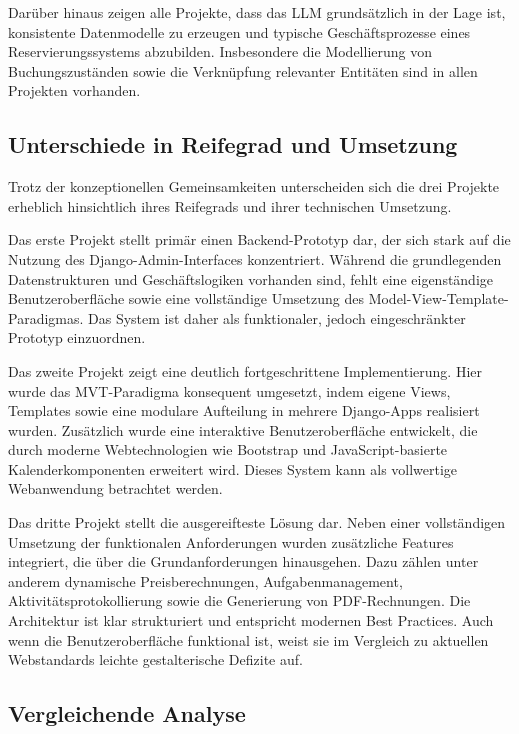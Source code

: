 Darüber hinaus zeigen alle Projekte, dass das LLM grundsätzlich in der Lage ist, konsistente Datenmodelle zu erzeugen und typische Geschäftsprozesse eines Reservierungssystems abzubilden. Insbesondere die Modellierung von Buchungszuständen sowie die Verknüpfung relevanter Entitäten sind in allen Projekten vorhanden.

\subsection{Unterschiede in Reifegrad und Umsetzung}

Trotz der konzeptionellen Gemeinsamkeiten unterscheiden sich die drei Projekte erheblich hinsichtlich ihres Reifegrads und ihrer technischen Umsetzung.

Das erste Projekt stellt primär einen Backend-Prototyp dar, der sich stark auf die Nutzung des Django-Admin-Interfaces konzentriert. Während die grundlegenden Datenstrukturen und Geschäftslogiken vorhanden sind, fehlt eine eigenständige Benutzeroberfläche sowie eine vollständige Umsetzung des Model-View-Template-Paradigmas. Das System ist daher als funktionaler, jedoch eingeschränkter Prototyp einzuordnen.

Das zweite Projekt zeigt eine deutlich fortgeschrittene Implementierung. Hier wurde das MVT-Paradigma konsequent umgesetzt, indem eigene Views, Templates sowie eine modulare Aufteilung in mehrere Django-Apps realisiert wurden. Zusätzlich wurde eine interaktive Benutzeroberfläche entwickelt, die durch moderne Webtechnologien wie Bootstrap und JavaScript-basierte Kalenderkomponenten erweitert wird. Dieses System kann als vollwertige Webanwendung betrachtet werden.

Das dritte Projekt stellt die ausgereifteste Lösung dar. Neben einer vollständigen Umsetzung der funktionalen Anforderungen wurden zusätzliche Features integriert, die über die Grundanforderungen hinausgehen. Dazu zählen unter anderem dynamische Preisberechnungen, Aufgabenmanagement, Aktivitätsprotokollierung sowie die Generierung von PDF-Rechnungen. Die Architektur ist klar strukturiert und entspricht modernen Best Practices. Auch wenn die Benutzeroberfläche funktional ist, weist sie im Vergleich zu aktuellen Webstandards leichte gestalterische Defizite auf.

\subsection{Vergleichende Analyse}

